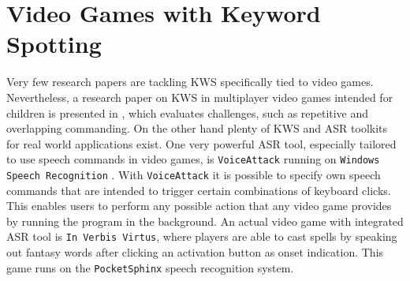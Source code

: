 
\section{Video Games with Keyword Spotting}\label{sec:prev_kws_games}
Very few research papers are tackling KWS specifically tied to video games.
Nevertheless, a research paper on KWS in multiplayer video games intended for children is presented in \cite{Harshavardhan2015}, which evaluates challenges, such as repetitive and overlapping commanding.
On the other hand plenty of KWS and ASR toolkits for real world applications exist.
One very powerful ASR tool, especially tailored to use speech commands in video games, is \texttt{VoiceAttack} running on \texttt{Windows Speech Recognition} \cite{Xiong2017}.
With \texttt{VoiceAttack} it is possible to specify own speech commands that are intended to trigger certain combinations of keyboard clicks.
This enables users to perform any possible action that any video game provides by running the program in the background.
An actual video game with integrated ASR tool is \texttt{In Verbis Virtus}, where players are able to cast spells by speaking out fantasy words after clicking an activation button as onset indication.
This game runs on the \texttt{PocketSphinx} \cite{Huggins2006} speech recognition system.